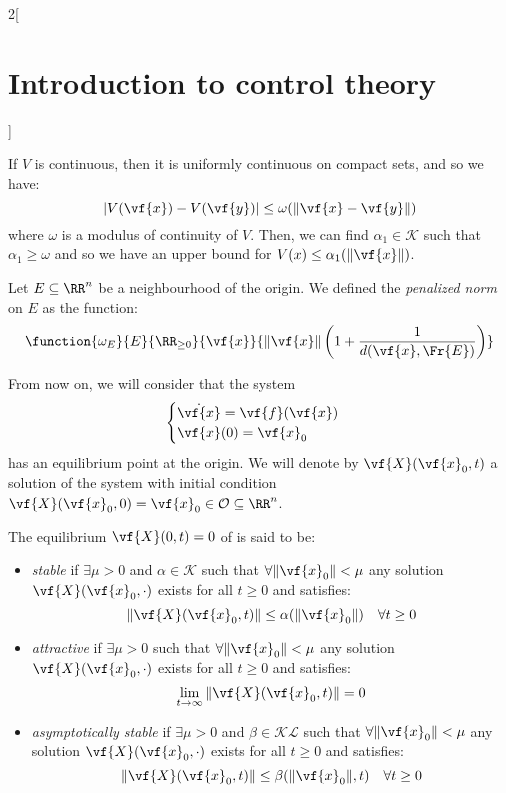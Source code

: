 \documentclass[../../../main_math.tex]{subfiles}
\begin{document}
\begin{multicols}{2}[\section{Introduction to control theory}]
\begin{lemma}
  \end{lemma}
  \begin{remark}
    If $V$ is continuous, then it is uniformly continuous on compact sets, and so we have:
    $$
      \abs{V(\vf{x}) - V(\vf{y})} \leq \omega(\norm{\vf{x}-\vf{y}})
    $$
    where $\omega$ is a modulus of continuity of $V$. Then, we can find $\alpha_1 \in \mathcal{K}$ such that $\alpha_1\geq \omega$ and so we have an upper bound for $V(x)\leq \alpha_1(\norm{\vf{x}})$.
  \end{remark}
  \begin{definition}
    Let $E\subseteq \RR^n$ be a neighbourhood of the origin. We defined the \emph{penalized norm} on $E$ as the function:
    $$
      \function{\omega_E}{E}{\RR_{\geq 0}}{\vf{x}}{\norm{\vf{x}}\left(1+\frac{1}{d(\vf{x}, \Fr{E})}\right)}
    $$
  \end{definition}
  From now on, we will consider that the system
  \begin{equation}\label{ICT:ode}
    \begin{cases}
      \dot{\vf{x}} = \vf{f}(\vf{x}) \\
      \vf{x}(0) = \vf{x}_0
    \end{cases}
  \end{equation}
  has an equilibrium point at the origin. We will denote by $\vf{X}(\vf{x}_0, t)$ a solution of the system with initial condition $\vf{X}(\vf{x}_0, 0) = \vf{x}_0\in \mathcal{O}\subseteq \RR^n$.
  \begin{definition}
    The equilibrium $\vf{X}(0, t)=0$ of  is said to be:
    \begin{itemize}
      \item \emph{stable} if $\exists\mu>0$ and $\alpha\in\mathcal{K}$ such that $\forall\norm{\vf{x}_0}<\mu$ any solution $\vf{X}(\vf{x}_0, \cdot)$ exists for all $t\geq 0$ and satisfies:
            $$
              \norm{\vf{X}(\vf{x}_0, t)}\leq \alpha(\norm{\vf{x}_0})\quad\forall t\geq 0
            $$
      \item \emph{attractive} if $\exists\mu>0$ such that $\forall\norm{\vf{x}_0}<\mu$ any solution $\vf{X}(\vf{x}_0, \cdot)$ exists for all $t\geq 0$ and satisfies:
            $$
              \lim_{t\to\infty}\norm{\vf{X}(\vf{x}_0, t)}=0
            $$
      \item \emph{asymptotically stable} if $\exists \mu>0$ and $\beta\in \mathcal{KL}$ such that $\forall\norm{\vf{x}_0}<\mu$ any solution $\vf{X}(\vf{x}_0, \cdot)$ exists for all $t\geq 0$ and satisfies:
            $$
              \norm{\vf{X}(\vf{x}_0, t)}\leq \beta(\norm{\vf{x}_0}, t)\quad\forall t\geq 0
$$
\end{itemize}
\end{definition}
\end{multicols}
\end{document}
